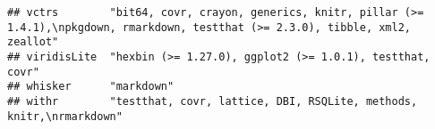 \documentclass[]{book}
\begin{document}
\begin{verbatim}
## vctrs        "bit64, covr, crayon, generics, knitr, pillar (>= 1.4.1),\npkgdown, rmarkdown, testthat (>= 2.3.0), tibble, xml2, zeallot"                                                                                                                                                                                                                                                                                                                                                                                                                                                                                                                                                                                
## viridisLite  "hexbin (>= 1.27.0), ggplot2 (>= 1.0.1), testthat, covr"                                                                                                                                                                                                                                                                                                                                                                                                                                                                                                                                                                                                                                                  
## whisker      "markdown"                                                                                                                                                                                                                                                                                                                                                                                                                                                                                                                                                                                                                                                                                                
## withr        "testthat, covr, lattice, DBI, RSQLite, methods, knitr,\nrmarkdown"                                                                                                                                                                                                                                                                                                                                                                                                                                                                                                                                                                                                                                       

\end{verbatim}
\end{document}
